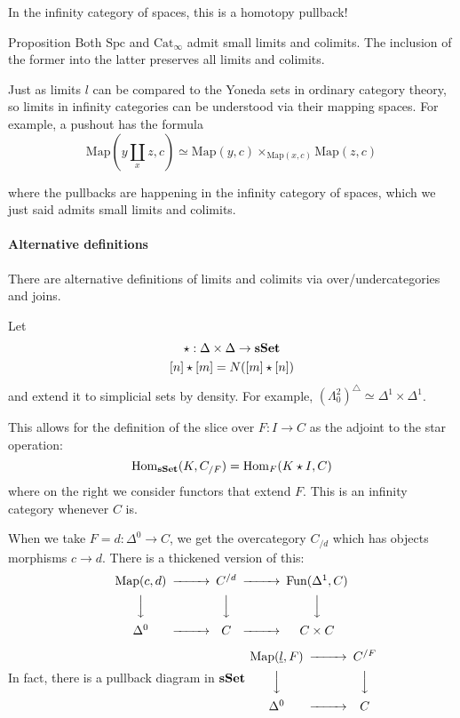 In the infinity category of spaces, this is a homotopy pullback!

\begin{proposition}{Proposition}{}
    Both $\mathrm{Spc}$ and $\mathrm{Cat}_\infty$ admit small limits and colimits. The inclusion of the former into the latter preserves all limits and colimits.
    
\end{proposition}

Just as limits $l$ can be compared to the Yoneda sets in ordinary category theory, so limits in infinity categories can be understood via their mapping spaces. For example, a pushout has the formula $$\mathrm{Map}(y\coprod_x z,c)\simeq \mathrm{Map}(y,c)\times_{\mathrm{Map}(x,c)} \mathrm{Map}(z,c)$$

where the pullbacks are happening in the infinity category of spaces, which we just said admits small limits and colimits.

\paragraph*{Alternative definitions}

There are alternative definitions of limits and colimits via over/undercategories and joins. 

Let \begin{gather*}
    \star:\Delta \times \Delta\rightarrow \operatorname{\mathbf{sSet}}\\
    [n]\star [m]=N([m]\star [n])
\end{gather*}
and extend it to simplicial sets by density. For example, $(\Lambda^2_0)^\triangle\simeq \Delta^1 \times \Delta^1$.

This allows for the definition of the slice over $F:I\rightarrow C$ as the adjoint to the star operation: $$\operatorname{Hom}_{\operatorname{\mathbf{sSet}}}(K,C_{/F})=\operatorname{Hom}_F(K\star I, C)$$
where on the right we consider functors that extend $F$. This is an infinity category whenever $C$ is.

When we take $F=d:\Delta^0\rightarrow C$, we get the overcategory $C_{/d}$ which has objects morphisms $c\rightarrow d$. There is a thickened version of this: $$\begin{CD}
   \mathrm{Map}(c,d)@> > > C^{/d}@> > > \Fun(\Delta^1,C) \\
   @VVV @VVV @VVV \\
   \Delta^0@> > > C @> > > C\times C
\end{CD}$$

In fact, there is a pullback diagram in $\operatorname{\mathbf{sSet}}$ $\begin{CD}
    \mathrm{Map}(\underline{l}, F)@ > > > C^{/F}\\
    @VVV @VVV \\
    \Delta^0 @> > > C
\end{CD}$

